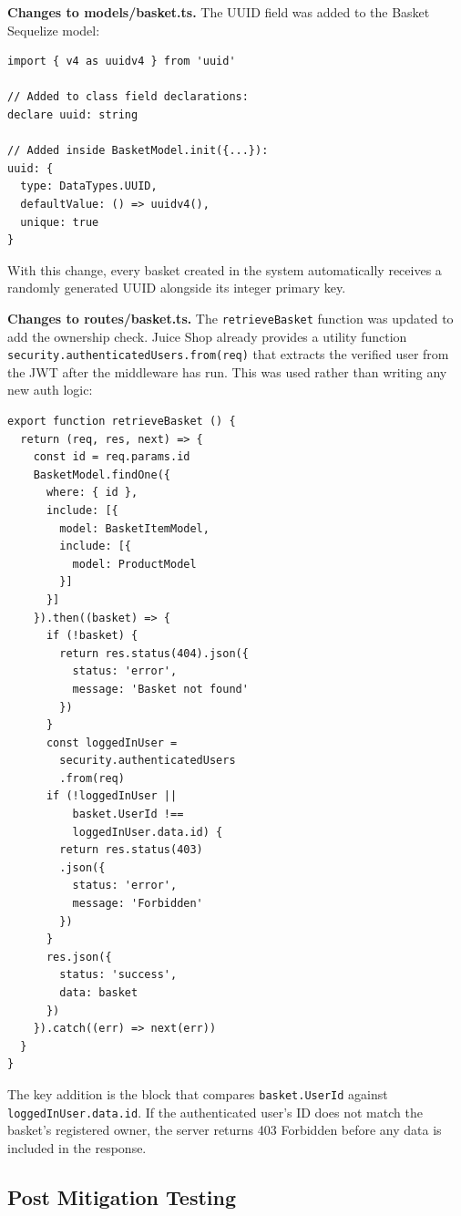 \documentclass[12pt]{IEEEtran}
\begin{document}
\textbf{Changes to models/basket.ts.} The UUID field was added to the Basket Sequelize model:

\begin{verbatim}
import { v4 as uuidv4 } from 'uuid'

// Added to class field declarations:
declare uuid: string

// Added inside BasketModel.init({...}):
uuid: {
  type: DataTypes.UUID,
  defaultValue: () => uuidv4(),
  unique: true
}
\end{verbatim}

With this change, every basket created in the system automatically receives a randomly generated UUID alongside its integer primary key.

\textbf{Changes to routes/basket.ts.} The \texttt{retrieveBasket} function was updated to add the ownership check. Juice Shop already provides a utility function \texttt{security.authenticatedUsers.from(req)} that extracts the verified user from the JWT after the middleware has run. This was used rather than writing any new auth logic:

\begin{verbatim}
export function retrieveBasket () {
  return (req, res, next) => {
    const id = req.params.id
    BasketModel.findOne({
      where: { id },
      include: [{
        model: BasketItemModel,
        include: [{
          model: ProductModel
        }]
      }]
    }).then((basket) => {
      if (!basket) {
        return res.status(404).json({
          status: 'error',
          message: 'Basket not found'
        })
      }
      const loggedInUser =
        security.authenticatedUsers
        .from(req)
      if (!loggedInUser ||
          basket.UserId !==
          loggedInUser.data.id) {
        return res.status(403)
        .json({
          status: 'error',
          message: 'Forbidden'
        })
      }
      res.json({
        status: 'success',
        data: basket
      })
    }).catch((err) => next(err))
  }
}
\end{verbatim}

The key addition is the block that compares \texttt{basket.UserId} against \texttt{loggedInUser.data.id}. If the authenticated user's ID does not match the basket's registered owner, the server returns 403 Forbidden before any data is included in the response.

\subsection{Post Mitigation Testing}
\end{document}
